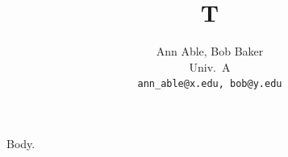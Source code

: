 \documentclass{article}
\title{T}
\author{Ann Able, Bob Baker\\ Univ.\ A\\ \texttt{ann\_able@x.edu, bob@y.edu}}
\begin{document}
\maketitle
Body.
\end{document}
